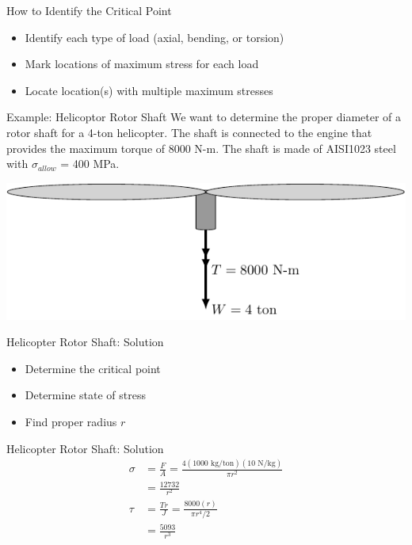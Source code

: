\documentclass[10pt, svgnames]{beamer}
\begin{document}
\begin{frame}[label={sec:org7be7db3}]{How to Identify the Critical Point}
\begin{itemize}
\item Identify each type of load (axial, bending, or torsion)
\item Mark locations of maximum stress for each load
\item Locate location(s) with multiple maximum stresses
\end{itemize}
\end{frame}


\begin{frame}[label={sec:org17d2d4f}]{Example: Helicoptor Rotor Shaft}
We want to determine the proper diameter of a rotor shaft for a 4-ton helicopter. The shaft is connected to the engine that provides the maximum torque of 8000 N-m. The shaft is made of AISI1023 steel with \(\sigma_{allow}\) = 400 MPa.

\begin{center}
\includegraphics[width=.9\linewidth]{pictures/helicopter-example.pdf}
\end{center}
\end{frame}

\begin{frame}[label={sec:orgebd4929}]{Helicopter Rotor Shaft: Solution}
\begin{itemize}
\item Determine the critical point
\item Determine state of stress
\item Find proper radius \(r\)
\end{itemize}
\end{frame}

\begin{frame}[label={sec:org9645683}]{Helicopter Rotor Shaft: Solution}
\begin{align*}
  \sigma &= \frac{F}{A} = \frac{4(1000 \text{ kg/ton})(10 \text{ N/kg})}{\pi r^2} \\
         &= \frac{12732}{r^2} \\
  \tau &= \frac{Tr}{J} = \frac{8000(r)}{\pi r^4/2} \\
         &= \frac{5093}{r^3}
\end{align*}
\end{frame}
\end{document}
